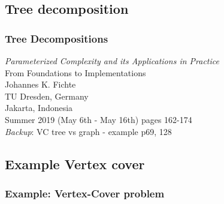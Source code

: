 \documentclass[c,8pt,xcolor...,x11names]{beamer}
\begin{document}
\subsection[TD]{Tree decomposition}
\begin{frame}
	\frametitle{Tree Decompositions}
	{\color{blue}\emph{Parameterized Complexity and its Applications in Practice} \\
		From Foundations to Implementations \\
		Johannes K. Fichte \\
		TU Dresden, Germany \\
		Jakarta, Indonesia \\
		{Summer 2019 (May 6th - May 16th)}
	}
	pages 162-174\\
	\bigskip
	\emph{Backup}: VC tree vs graph - example p69, 128
\end{frame}
%	

\subsection{Example Vertex cover}
\begin{frame}
	\frametitle[Vertex Cover]{Example: Vertex-Cover problem}

\end{frame}
\end{document}
